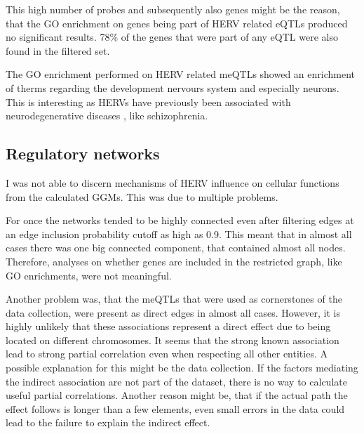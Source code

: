 \documentclass[a4paper,12pt,twoside,openright]{article}
\begin{document}
This high number of probes and subsequently also genes might be the reason, that the GO enrichment on genes being part of HERV related eQTLs produced no significant results. 78\% of the genes that were part of any eQTL were also found in the filtered set.

The GO enrichment performed on HERV related meQTLs showed an enrichment of therms regarding the development nervours system and especially neurons. This is interesting as HERVs have previously been associated with neurodegenerative diseases \cite{Mortelmans2016}, like schizophrenia\cite{10.3389/fpsyt.2015.00183}.

\subsection{Regulatory networks}
\label{Discussion:Regulatory networks}


I was not able to discern mechanisms of HERV influence on cellular functions from the calculated GGMs. This was due to multiple problems. 

For once the networks tended to be highly connected even after filtering edges at an edge inclusion probability cutoff as high as 0.9. This meant that in almost all cases there was one big connected component, that contained almost all nodes. Therefore, analyses on whether genes are included in the restricted graph, like GO enrichments, were not meaningful. 

Another problem was, that the meQTLs that were used as cornerstones of the data collection, were present as direct edges in almost all cases. However, it is highly  unlikely that these associations represent a direct effect due to being located on different chromosomes. It seems that the strong known association lead to strong partial correlation even when respecting all other entities. A possible explanation for this might be the data collection. If the factors mediating the indirect association are not part of the dataset, there is no way to calculate useful partial correlations. Another reason might be, that if the actual path the effect follows is longer than a few elements, even small errors in the data could lead to the failure to explain the indirect effect. 
\end{document}
